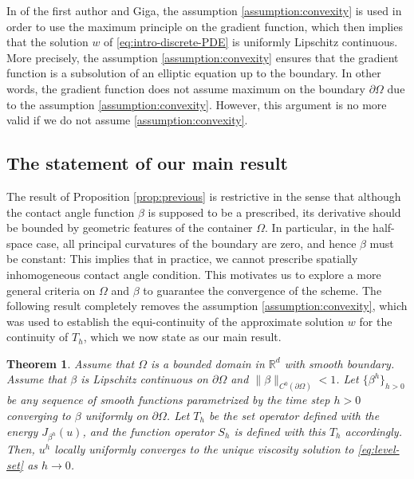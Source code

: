 \documentclass[11pt]{article}
\numberwithin{equation}{section}
\newtheorem{theorem}{Theorem}[section]
\newcommand{\R}{\mathbb{R}}
\newcommand{\pOmega}[0]{\partial\Omega}
\begin{document}
In \cite{EG25} of the first author and Giga, the assumption \eqref{assumption:convexity} is used in order to use the maximum principle on the gradient function, which then implies that the solution $w$ of \eqref{eq:intro-discrete-PDE} is uniformly Lipschitz continuous. More precisely, the assumption \eqref{assumption:convexity} ensures that the gradient function is a subsolution of an elliptic equation up to the boundary. In other words,  the gradient function does not assume maximum on the boundary $\partial\Omega$ due to the assumption \eqref{assumption:convexity}. However, this argument is no more valid if we do not assume \eqref{assumption:convexity}.


\subsection{The statement of our main result} The result of Proposition \ref{prop:previous} is restrictive in the sense that although the contact angle function $\beta$ is supposed to be a prescribed, its derivative
should be bounded by geometric features of the container $\Omega$.
In particular, in the half-space case, all principal curvatures of the boundary are zero, and hence $\beta$ must be constant: This implies that in practice, we cannot prescribe spatially inhomogeneous contact angle condition. This motivates us to explore a more general criteria on $\Omega$ and $\beta$ to guarantee the convergence of the scheme. The following result completely removes the assumption \eqref{assumption:convexity}, which was used to establish the equi-continuity of the approximate solution $w$ for the continuity of $T_h$, which we now state as our main result.

\begin{theorem}\label{thm:main}
Assume that $\Omega$ is a bounded domain in $\R^d$ with smooth boundary.
Assume that $\beta$ is Lipschitz continuous on $\pOmega$ and $\|\beta\|_{C^0(\partial\Omega)}<1$.
Let $\{\beta^h\}_{h>0}$ be any sequence of smooth functions parametrized by the time step $h>0$ converging to $\beta$ uniformly on $\pOmega$. Let $T_h$ be the set operator defined with the energy $J_{\beta^h}(u)$, and the function operator $S_h$ is defined with this $T_h$ accordingly.
Then, $u^h$ locally uniformly converges to the unique viscosity solution to \eqref{eq:level-set} as $h\to 0$.
\end{theorem}
\end{document}
